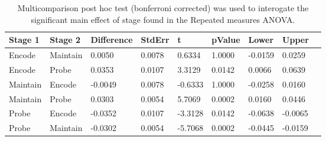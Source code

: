 \begin{table}
\centering
\begin{tabular}[0.2em]{@{}lllllllll@{}}\toprule
Stage 1 & Stage 2 & Difference & StdErr & t & pValue & Lower & Upper\\\toprule[0.2em]
Encode & Maintain & 0.0050 & 0.0078 & 0.6334 & 1.0000 & -0.0159 & 0.0259 \\\midrule
Encode & Probe & 0.0353 & 0.0107 & 3.3129 & 0.0142 & 0.0066 & 0.0639 \\\midrule
Maintain & Encode & -0.0049 & 0.0078 & -0.6333 & 1.0000 & -0.0258 & 0.0160 \\\midrule
Maintain & Probe & 0.0303 & 0.0054 & 5.7069 & 0.0002 & 0.0160 & 0.0446 \\\midrule
Probe & Encode & -0.0352 & 0.0107 & -3.3128 & 0.0142 & -0.0638 & -0.0065 \\\midrule
Probe & Maintain & -0.0302 & 0.0054 & -5.7068 & 0.0002 & -0.0445 & -0.0159 \\\bottomrule[0.2em]
\end{tabular}
\caption{Multicomparison post hoc test (bonferroni corrected) was used to interogate the significant main effect of stage found in the Repeated measures ANOVA.\label{tabel:tbl_RMAAFC2_PH_Stage}}
\end{table}
